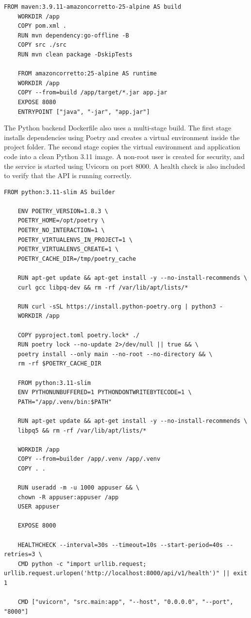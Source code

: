 \documentclass[12pt,a4paper]{article}
\begin{document}
\begin{lstlisting}[style=dockerstyle,caption={Dockerfile for Java Backend}]
	FROM maven:3.9.11-amazoncorretto-25-alpine AS build
	WORKDIR /app
	COPY pom.xml .
	RUN mvn dependency:go-offline -B
	COPY src ./src
	RUN mvn clean package -DskipTests
	
	FROM amazoncorretto:25-alpine AS runtime
	WORKDIR /app
	COPY --from=build /app/target/*.jar app.jar
	EXPOSE 8080
	ENTRYPOINT ["java", "-jar", "app.jar"]
\end{lstlisting}
\vspace{0.5cm} 

The Python backend Dockerfile also uses a multi-stage build. The first stage installs dependencies using Poetry and creates a virtual environment inside the project folder. The second stage copies the virtual environment and application code into a clean Python 3.11 image. A non-root user is created for security, and the service is started using Uvicorn on port 8000. A health check is also included to verify that the API is running correctly.\\

\begin{lstlisting}[style=dockerstyle,caption={Dockerfile for Python Backend}]
	FROM python:3.11-slim AS builder
	
	ENV POETRY_VERSION=1.8.3 \
	POETRY_HOME=/opt/poetry \
	POETRY_NO_INTERACTION=1 \
	POETRY_VIRTUALENVS_IN_PROJECT=1 \
	POETRY_VIRTUALENVS_CREATE=1 \
	POETRY_CACHE_DIR=/tmp/poetry_cache
	
	RUN apt-get update && apt-get install -y --no-install-recommends \
	curl gcc libpq-dev && rm -rf /var/lib/apt/lists/*
	
	RUN curl -sSL https://install.python-poetry.org | python3 -
	WORKDIR /app
	
	COPY pyproject.toml poetry.lock* ./
	RUN poetry lock --no-update 2>/dev/null || true && \
	poetry install --only main --no-root --no-directory && \
	rm -rf $POETRY_CACHE_DIR
	
	FROM python:3.11-slim
	ENV PYTHONUNBUFFERED=1 PYTHONDONTWRITEBYTECODE=1 \
	PATH="/app/.venv/bin:$PATH"
	
	RUN apt-get update && apt-get install -y --no-install-recommends \
	libpq5 && rm -rf /var/lib/apt/lists/*
	
	WORKDIR /app
	COPY --from=builder /app/.venv /app/.venv
	COPY . .
	
	RUN useradd -m -u 1000 appuser && \
	chown -R appuser:appuser /app
	USER appuser
	
	EXPOSE 8000
	
	HEALTHCHECK --interval=30s --timeout=10s --start-period=40s --retries=3 \
	CMD python -c "import urllib.request; urllib.request.urlopen('http://localhost:8000/api/v1/health')" || exit 1
	
	CMD ["uvicorn", "src.main:app", "--host", "0.0.0.0", "--port", "8000"]
\end{lstlisting}
\vspace{0.5cm} 
\end{document}
